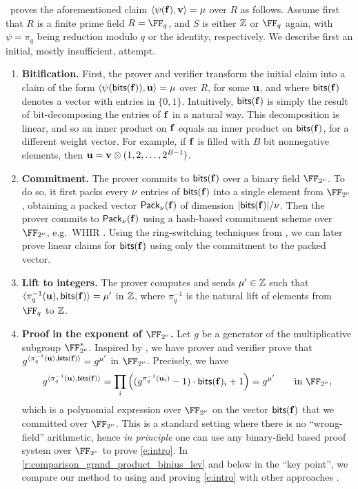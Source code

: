  \ftwoz \ proves the aforementioned claim $\langle \psi(\mathbf{f}), \mathbf{v} \rangle = \mu$ over $R$ as follows. Assume first that $R$ is a finite prime field $R=\FF_q$, and $S$ is either $\mathbb{Z}$ or $\FF_q$ again, with $\psi=\pi_q$ being reduction modulo $q$ or the identity, respectively.  We  describe first an initial, mostly insufficient, attempt.
 \medskip
     \begin{enumerate}[leftmargin=*,nosep]
         \item  \textbf{Bitification.} First, the prover and verifier transform the  initial claim into a claim of the form  $\langle \psi(\mathsf{bits}(\mathbf{f})), \mathbf{u} \rangle = \mu$ over $R$, for some $\mathbf{u}$, and where $\mathsf{bits}(\mathbf{f})$ denotes a vector  with entries in $\{0,1\}$. Intuitively, $\mathsf{bits}(\mathbf{f})$ is simply the result of  bit-decomposing the entries of $\mathbf{f}$ in a natural way. This decomposition is linear, and so an inner product on $\mathbf{f}$ equals an inner product on $\mathsf{bits}(\mathbf{f})$, for a different weight vector. For example, if $\mathbf{f}$ is filled with $B$ bit nonnegative elements, then $\mathbf{u}=  \mathbf{v}\otimes(1,2,\ldots, 2^{B-1})$.
         \item \textbf{Commitment.} The prover commits to $\mathsf{bits}(\mathbf{f})$ over a binary field $\comfield$. To do so, it first packs every $\nu$ entries of $\mathsf{bits}(\mathbf{f})$ into a single element from $\comfield$, obtaining a packed vector $\mathsf{Pack}_\nu(\mathbf{f})$ of dimension $|\mathsf{bits}(\mathbf{f})|/\nu$. Then the prover commits to $\mathsf{Pack}_\nu(\mathbf{f})$ using a hash-based  commitment scheme  over $\comfield$, e.g.\ WHIR \cite{whir}.  Using the ring-switching techniques from \cite{binius,binius2}, we can later prove linear claims for $\mathsf{bits}(\mathbf{f})$ using only the commitment to the packed vector. 
         \item \textbf{Lift to integers.} The prover computes and sends $\mu'\in \mathbb{Z}$ such that $\langle \pi_q^{-1}(\mathbf{u}), \mathsf{bits}(\mathbf{f})\rangle = \mu'$ in $\mathbb{Z}$, where $\pi_q^{-1}$ is the natural lift of elements from $\FF_q$ to $\mathbb{Z}$.
         \item \textbf{Proof in the exponent of $\comfield$.} Let $g$ be a generator of the multiplicative subgroup $\comfield^*$. Inspired by \cite{binius64}, we have prover and verifier  prove that $g^{\langle \pi_q^{-1}(\mathbf{u}), \mathsf{bits}(\mathbf{f})\rangle} = g^{\mu'}$ in $\comfield$. Precisely, we have
         \begin{equation}\label{e:intro}
         g^{\langle \pi_q^{-1}(\uu), \bitstext(\bff)\rangle} = \prod_{i} \left((g^{\pi_q^{-1}(\uu_i)} -1) \cdot \bitstext(\bff)_i + 1 \right) = g^{\mu'} \qquad \text{in } \comfield,
         \end{equation}
         which is a polynomial expression over $\comfield$ on the vector $\mathsf{bits}(\mathbf{f})$ that we committed over $\comfield$.  This is a standard setting where there is no ``wrong-field'' arithmetic, hence \emph{in principle} one can use any binary-field based proof system over $\comfield$ to prove \eqref{e:intro}.   In \cref{r:comparison_grand_product_binius_lev} and below in the ``key point'', we compare our method to using and proving \eqref{e:intro} with other approaches \cite{binius64,lev}.
%
     \end{enumerate}  

